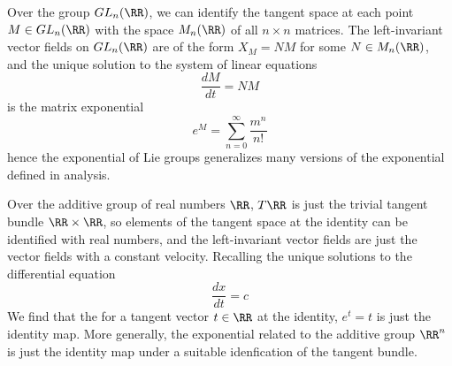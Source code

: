 \begin{example}
    Over the group $GL_n(\RR)$, we can identify the tangent space at each point $M \in GL_n(\RR)$ with the space $M_n(\RR)$ of all $n \times n$ matrices. The left-invariant vector fields on $GL_n(\RR)$ are of the form $X_M = NM$ for some $N \in M_n(\RR)$, and the unique solution to the system of linear equations
    \[ \frac{dM}{dt} = NM \]
    is the matrix exponential
    \[ e^M = \sum_{n = 0}^\infty \frac{m^n}{n!} \]
    hence the exponential of Lie groups generalizes many versions of the exponential defined in analysis.
\end{example}

\begin{example}
    Over the additive group of real numbers $\RR$, $T\RR$ is just the trivial tangent bundle $\RR \times \RR$, so elements of the tangent space at the identity can be identified with real numbers, and the left-invariant vector fields are just the vector fields with a constant velocity. Recalling the unique solutions to the differential equation
    \[ \frac{dx}{dt} = c \]
    We find that the for a tangent vector $t \in \RR$ at the identity, $e^t = t$ is just the identity map. More generally, the exponential related to the additive group $\RR^n$ is just the identity map under a suitable idenfication of the tangent bundle.
\end{example}

